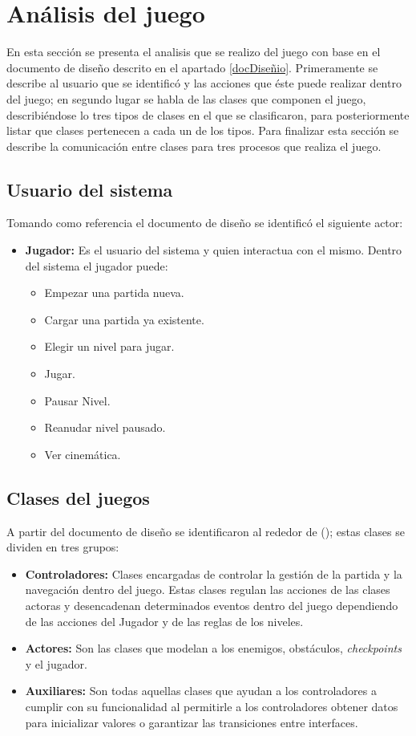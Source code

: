 \section{Análisis del juego}	
En esta sección se presenta el analisis que se realizo del juego con base en el 
documento de diseño descrito en el apartado \ref{docDiseñio}. Primeramente se 
describe al usuario que se identificó y las acciones que éste puede realizar 
dentro del juego; en segundo lugar se habla de las clases que componen el juego, 
describiéndose lo tres tipos de clases en el que se clasificaron, para 
posteriormente listar que clases pertenecen a cada un de los tipos. Para finalizar 
esta sección se describe la comunicación entre clases para tres procesos que 
realiza el juego. 

	\subsection{Usuario del sistema}
	Tomando como referencia el documento de diseño se identificó el siguiente actor:
	\begin{itemize}
		\item \textbf{Jugador:} Es el usuario del sistema y quien interactua con
		el mismo. Dentro del sistema el jugador puede: 
			\begin{itemize}
				\item Empezar una partida nueva.	
				\item Cargar una partida ya existente.
				\item Elegir un nivel para jugar.  
				\item Jugar.
				\item Pausar Nivel.
				\item Reanudar nivel pausado.
				\item Ver cinemática.
			\end{itemize}			   
	\end{itemize}	
	
	\subsection{Clases del juegos}
	A partir del documento de diseño se identificaron al rededor de (); estas 
	clases se dividen en tres grupos:
		\begin{itemize}
			\item \textbf{Controladores:} Clases encargadas de controlar la gestión de 
			la partida y la navegación dentro del juego. Estas clases regulan las acciones 
			de las clases actoras y desencadenan determinados eventos dentro del juego
			dependiendo de las acciones del Jugador y de las reglas de los niveles.
			
			\item \textbf{Actores:} Son las clases que modelan a los enemigos, obstáculos,
			\textit{checkpoints} y el jugador.
			 
			 \item \textbf{Auxiliares:} Son todas aquellas clases que ayudan a los controladores
			 a cumplir con su funcionalidad al permitirle a los controladores obtener datos 
			 para inicializar valores o garantizar las transiciones entre interfaces.
		\end{itemize}
		
